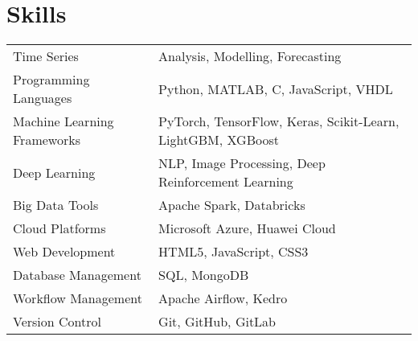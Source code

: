 \documentclass[a4paper,10pt]{article}
\begin{document}
\section{Skills}
\begin{tabularx}{\linewidth}{@{}l X@{}}
Time Series & Analysis, Modelling, Forecasting\\
Programming Languages & Python, MATLAB, C, JavaScript, VHDL\\
Machine Learning Frameworks & PyTorch, TensorFlow, Keras, Scikit-Learn, LightGBM, XGBoost\\
Deep Learning & NLP, Image Processing, Deep Reinforcement Learning\\
Big Data Tools & Apache Spark, Databricks\\
Cloud Platforms & Microsoft Azure, Huawei Cloud\\
Web Development & HTML5, JavaScript, CSS3\\
Database Management & SQL, MongoDB\\
Workflow Management & Apache Airflow, Kedro\\
Version Control & Git, GitHub, GitLab\\
\end{tabularx}





\vfill
{}
\end{document}
